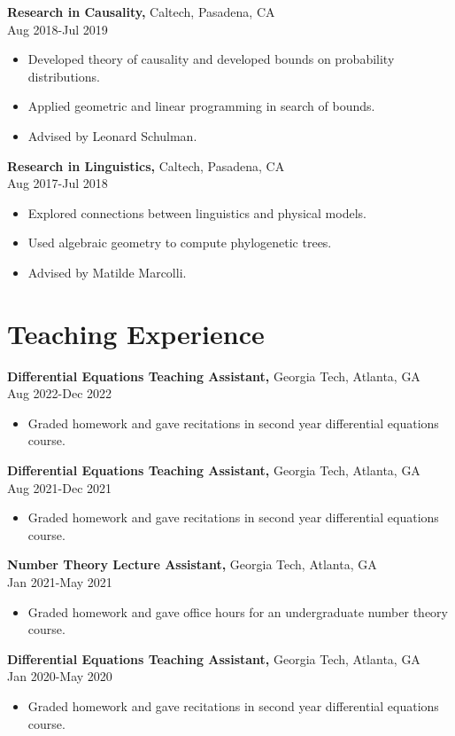 \documentclass[margin]{res}
\begin{document}
\begin{resume}
{\bf Research in Causality,} Caltech, Pasadena, CA \\ Aug 2018-Jul 2019
\begin{itemize} \itemsep -2pt %
\item Developed theory of causality and developed bounds on probability distributions.
\item Applied geometric and linear programming in search of bounds.
\item Advised by Leonard Schulman.
\end{itemize}
 
{\bf Research in Linguistics,} Caltech, Pasadena, CA \\ Aug 2017-Jul 2018
\begin{itemize} \itemsep -2pt %
\item Explored connections between linguistics and physical models.
\item Used algebraic geometry to compute phylogenetic trees.
\item Advised by Matilde Marcolli.
\end{itemize}

\section{Teaching Experience}
{\bf Differential Equations Teaching Assistant,} Georgia Tech, Atlanta, GA \\ Aug 2022-Dec 2022
\begin{itemize} \itemsep -2pt %
    \item Graded homework and gave recitations in second year differential equations course.
\end{itemize}
{\bf Differential Equations Teaching Assistant,} Georgia Tech, Atlanta, GA \\ Aug 2021-Dec 2021
\begin{itemize} \itemsep -2pt %
    \item Graded homework and gave recitations in second year differential equations course.
\end{itemize}
{\bf Number Theory Lecture Assistant,} Georgia Tech, Atlanta, GA \\ Jan 2021-May 2021
\begin{itemize} \itemsep -2pt %
    \item Graded homework and gave office hours for an undergraduate number theory course.
\end{itemize}
{\bf Differential Equations Teaching Assistant,} Georgia Tech, Atlanta, GA \\ Jan 2020-May 2020
\begin{itemize} \itemsep -2pt %
    \item Graded homework and gave recitations in second year differential equations course.
\end{itemize}


\end{resume}
\end{document}
